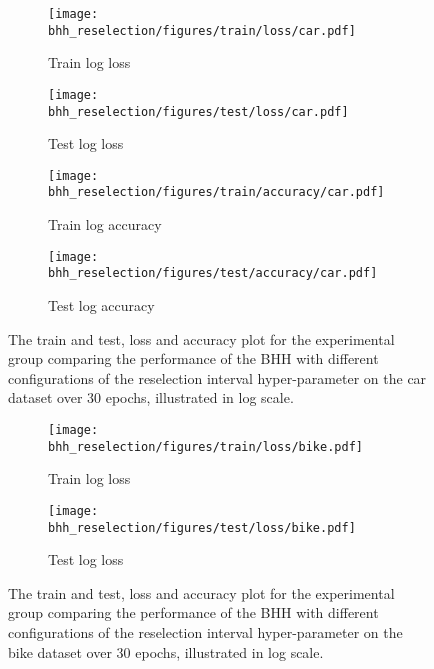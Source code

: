 \begin{figure}[htbp]
	\begin{subfigure}{0.5\textwidth}
		\centering
		\texttt{[image: bhh\_reselection/figures/train/loss/car.pdf]}
		\caption{Train log loss}
		\label{fig:results:reselection:figures:loss:train:car}
	\end{subfigure}
	\begin{subfigure}{0.5\textwidth}
		\centering
		\texttt{[image: bhh\_reselection/figures/test/loss/car.pdf]}
		\caption{Test log loss}
		\label{fig:results:reselection:figures:loss:test:car}
	\end{subfigure}
	\par\bigskip
	\begin{subfigure}{0.5\textwidth}
		\centering
		\texttt{[image: bhh\_reselection/figures/train/accuracy/car.pdf]}
		\caption{Train log accuracy}
		\label{fig:results:reselection:figures:accuracy:train:car}
	\end{subfigure}
	\begin{subfigure}{0.5\textwidth}
		\centering
		\texttt{[image: bhh\_reselection/figures/test/accuracy/car.pdf]}
		\caption{Test log accuracy}
		\label{fig:results:reselection:figures:accuracy:test:car}
	\end{subfigure}
	\par\bigskip
	\caption{The train and test, loss and accuracy plot for the experimental group comparing the performance of the \acs{BHH} with different configurations of the reselection interval hyper-parameter on the car dataset over 30 epochs, illustrated in log scale.}
	\label{fig:results:reselection:figures:car}
\end{figure}



\begin{figure}[htbp]
	\begin{subfigure}{0.5\textwidth}
		\centering
		\texttt{[image: bhh\_reselection/figures/train/loss/bike.pdf]}
		\caption{Train log loss}
		\label{fig:results:reselection:figures:loss:train:bike}
	\end{subfigure}
	\begin{subfigure}{0.5\textwidth}
		\centering
		\texttt{[image: bhh\_reselection/figures/test/loss/bike.pdf]}
		\caption{Test log loss}
		\label{fig:results:reselection:figures:loss:test:bike}
	\end{subfigure}
	\par\bigskip
	\caption{The train and test, loss and accuracy plot for the experimental group comparing the performance of the \acs{BHH} with different configurations of the reselection interval hyper-parameter on the bike dataset over 30 epochs, illustrated in log scale.}
	\label{fig:results:reselection:figures:bike}
\end{figure}


